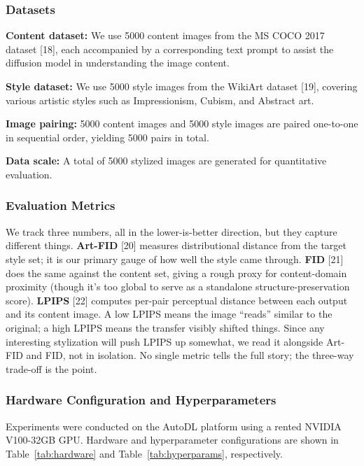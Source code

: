 \documentclass[10pt,twocolumn]{article}
\begin{document}
\subsubsection{Datasets}

{\bfseries Content dataset:} We use 5000 content images from the MS COCO 2017 dataset [18], each accompanied by a corresponding text prompt to assist the diffusion model in understanding the image content.

{\bfseries Style dataset:} We use 5000 style images from the WikiArt dataset [19], covering various artistic styles such as Impressionism, Cubism, and Abstract art.

{\bfseries Image pairing:} 5000 content images and 5000 style images are paired one-to-one in sequential order, yielding 5000 pairs in total.

{\bfseries Data scale:} A total of 5000 stylized images are generated for quantitative evaluation.

\subsubsection{Evaluation Metrics}

We track three numbers, all in the lower-is-better direction, but they capture different things. {\bfseries Art-FID} [20] measures distributional distance from the target style set; it is our primary gauge of how well the style came through. {\bfseries FID} [21] does the same against the content set, giving a rough proxy for content-domain proximity (though it's too global to serve as a standalone structure-preservation score). {\bfseries LPIPS} [22] computes per-pair perceptual distance between each output and its content image. A low LPIPS means the image ``reads'' similar to the original; a high LPIPS means the transfer visibly shifted things. Since any interesting stylization will push LPIPS up somewhat, we read it alongside Art-FID and FID, not in isolation. No single metric tells the full story; the three-way trade-off is the point.

\subsubsection{Hardware Configuration and Hyperparameters}

Experiments were conducted on the AutoDL platform using a rented NVIDIA V100-32GB GPU. Hardware and hyperparameter configurations are shown in Table~\ref{tab:hardware} and Table~\ref{tab:hyperparams}, respectively.
\end{document}
